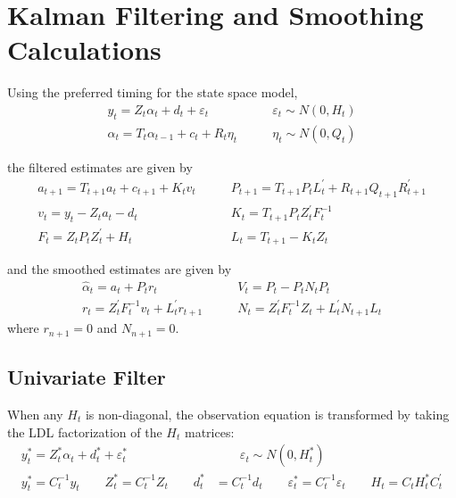 \documentclass[12pt]{article}
\begin{document}
\section{Kalman Filtering and Smoothing Calculations}
	Using the preferred timing for the state space model,
	\begin{align*} 
	y_t = Z_t \alpha_t + d_t + \varepsilon_t &\qquad \varepsilon_t \sim N(0,H_t) \\ 
	\alpha_{t} = T_t \alpha_{t-1} + c_t + R_t \eta_t &\qquad \eta_t \sim N(0, Q_t)
	\end{align*} 

	the filtered estimates are given by 
	\begin{align*}
	a_{t+1} = T_{t+1} a_t + c_{t+1} + K_t v_t &\qquad
	P_{t+1} = T_{t+1} P_t L_t^\prime + R_{t+1} Q_{t+1} R_{t+1}^\prime \\
	v_t = y_t - Z_ta_t - d_t &\qquad
	K_t = T_{t+1} P_t Z_t^\prime F_t^{-1} \\
	F_t = Z_t P_t Z_t^\prime + H_t &\qquad
	L_t = T_{t+1} - K_t Z_t 
	\end{align*} 

	and the smoothed estimates are given by
	\begin{align*}
	\hat{\alpha}_t = a_t + P_t r_t &\qquad V_t = P_t - P_t N_t P_t \\ 
	r_t = Z_t^\prime F_t^{-1} v_t + L_t^\prime r_{t+1} &\qquad N_{t} = Z_t^\prime F_t^{-1} Z_t + L_t^\prime N_{t+1} L_t
	\end{align*}
	where $r_{n+1} = 0$ and $N_{n+1} = 0$. 

\subsection*{Univariate Filter}
	When any $H_t$ is non-diagonal, the observation equation is transformed by taking the LDL factorization of the $H_t$ matrices:
	\begin{align*}
	y_t^* = Z_t^* \alpha_t + d_t^* + \varepsilon_t^* &\qquad \varepsilon_t \sim N(0, H_t^*)\\
	y_t^* = C_t^{-1} y_t \qquad Z_t^* = C_t^{-1} Z_t \qquad d_t^* &= C_t^{-1} d_t \qquad \varepsilon_t^* = C_t^{-1} \varepsilon_t \qquad H_t = C_t H_t^* C_t^\prime
	\end{align*}
\end{document}
